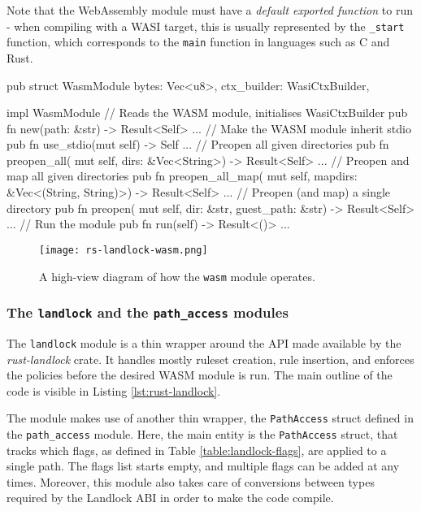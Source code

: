 Note that the WebAssembly module must have a \textit{default exported function} to run - when compiling with a WASI target,
this is usually represented by the \texttt{\_start} function, which corresponds to the \texttt{main} function in languages
such as C and Rust.\\

\begin{code}[language=Rust, caption=The outline of the \texttt{wasm} module., label=lst:wasm-module-outline]
pub struct WasmModule {
  bytes: Vec<u8>, ctx_builder: WasiCtxBuilder,
}

impl WasmModule {
  // Reads the WASM module, initialises WasiCtxBuilder
  pub fn new(path: &str) -> Result<Self> {...}
  // Make the WASM module inherit stdio
  pub fn use_stdio(mut self) -> Self {...}
  // Preopen all given directories
  pub fn preopen_all(
    mut self,
    dirs: &Vec<String>) -> Result<Self> {...}
  // Preopen and map all given directories
  pub fn preopen_all_map(
    mut self,
    mapdirs: &Vec<(String, String)>)
    -> Result<Self> {...}
  // Preopen (and map) a single directory
  pub fn preopen(
    mut self,
    dir: &str, guest_path: &str) -> Result<Self> {...}
  // Run the module
  pub fn run(self) -> Result<()> {...}
}  
\end{code}

\begin{figure}[ht]
  \centering
  \texttt{[image: rs-landlock-wasm.png]}
  \caption{A high-view diagram of how the \texttt{wasm} module operates.}
  \label{fig:wasm-module}
\end{figure}

\subsubsection{The \texttt{landlock} and the \texttt{path\_access} modules}

The \texttt{landlock} module is a thin wrapper around the API made available by the \textit{rust-landlock} crate.
It handles mostly ruleset creation, rule insertion, and enforces the policies before the desired WASM module is run.
The main outline of the code is visible in Listing \ref{lst:rust-landlock}.

The module makes use of another thin wrapper, the \texttt{PathAccess} struct defined in the \texttt{path\_access} module.
Here, the main entity is the \texttt{PathAccess} struct, that tracks which flags, as defined in Table \ref{table:landlock-flags},
are applied to a single path. The flags list starts empty, and multiple flags can be added at any times.
Moreover, this module also takes care of conversions between types required by the Landlock ABI in order
to make the code compile.

